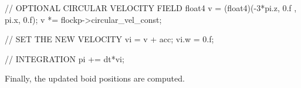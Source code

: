 \begin{cppcode}{0}
// OPTIONAL CIRCULAR VELOCITY FIELD
float4 v = (float4)(-3*pi.z, 0.f , pi.x, 0.f);
v *= flockp->circular_vel_const;

// SET THE NEW VELOCITY
vi = v + acc;
vi.w = 0.f;

// INTEGRATION
pi += dt*vi; 
\end{cppcode}

Finally, the updated boid positions are computed.


